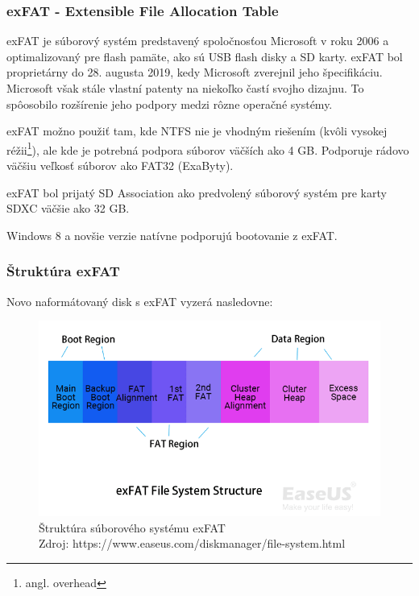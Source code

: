 \documentclass[12pt,oneside,slovak,a4paper]{article}
\begin{document}
\subsubsection{exFAT - Extensible File Allocation Table}
exFAT je súborový systém predstavený spoločnosťou Microsoft v roku 2006 a optimalizovaný pre flash pamäte, ako sú USB flash disky a SD karty. exFAT bol proprietárny do 28. augusta 2019, kedy Microsoft zverejnil jeho špecifikáciu. Microsoft však stále vlastní patenty na niekoľko častí svojho dizajnu. To spôosobilo rozšírenie jeho podpory medzi rôzne operačné systémy.

exFAT možno použiť tam, kde NTFS nie je vhodným riešením (kvôli vysokej réžii\footnote{angl. overhead}), ale kde je potrebná podpora súborov väčších ako 4 GB. Podporuje rádovo väčšiu veľkosť súborov ako FAT32 (ExaByty).

exFAT bol prijatý SD Association ako predvolený súborový systém pre karty SDXC väčšie ako 32 GB.

Windows 8 a novšie verzie natívne podporujú bootovanie z exFAT.

\subsubsection{Štruktúra exFAT}
Novo naformátovaný disk s exFAT vyzerá nasledovne:

\begin{figure}[H]
	\centering
	\captionsetup{justification=centering,margin=2cm}
	\includegraphics[width=\linewidth]{./images/file_system_structure/exfat-file-system-structure.png} %
	\centering
	\caption{Štruktúra súborového systému exFAT \\ Zdroj: https://www.easeus.com/diskmanager/file-system.html}
\end{figure}
\end{document}
